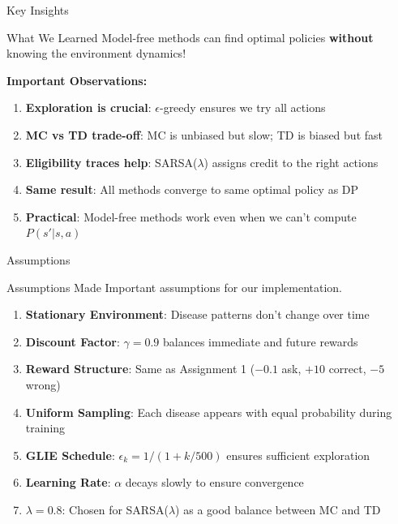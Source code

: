 \documentclass[aspectratio=169]{beamer}
\begin{document}
\begin{frame}{Key Insights}
    \begin{block}{What We Learned}
        Model-free methods can find optimal policies \textbf{without} knowing the environment dynamics!
    \end{block}

    \vspace{0.3cm}

    \textbf{Important Observations:}
    \begin{enumerate}
        \item \textbf{Exploration is crucial}: $\epsilon$-greedy ensures we try all actions
        \item \textbf{MC vs TD trade-off}: MC is unbiased but slow; TD is biased but fast
        \item \textbf{Eligibility traces help}: SARSA($\lambda$) assigns credit to the right actions
        \item \textbf{Same result}: All methods converge to same optimal policy as DP
        \item \textbf{Practical}: Model-free methods work even when we can't compute $P(s'|s,a)$
    \end{enumerate}
\end{frame}

\begin{frame}{Assumptions}
    \begin{block}{Assumptions Made}
        Important assumptions for our implementation.
    \end{block}

    \vspace{0.3cm}

    \begin{enumerate}
        \item \textbf{Stationary Environment}: Disease patterns don't change over time
        \item \textbf{Discount Factor}: $\gamma = 0.9$ balances immediate and future rewards
        \item \textbf{Reward Structure}: Same as Assignment 1 ($-0.1$ ask, $+10$ correct, $-5$ wrong)
        \item \textbf{Uniform Sampling}: Each disease appears with equal probability during training
        \item \textbf{GLIE Schedule}: $\epsilon_k = 1/(1 + k/500)$ ensures sufficient exploration
        \item \textbf{Learning Rate}: $\alpha$ decays slowly to ensure convergence
        \item \textbf{$\lambda = 0.8$}: Chosen for SARSA($\lambda$) as a good balance between MC and TD
    \end{enumerate}
\end{frame}
\end{document}
